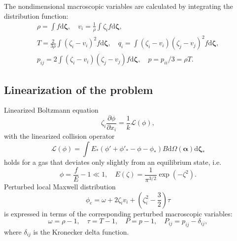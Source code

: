 \documentclass[review]{elsarticle}
\newcommand{\dd}{\mathrm{d}}
\newcommand{\pder}[2][]{\frac{\partial#1}{\partial#2}}
\newcommand{\dzeta}{\boldsymbol{\dd\zeta}}
\begin{document}
The nondimensional macroscopic variables are calculated by integrating the distribution function:
\begin{equation}\label{eq:macro}
    \begin{gathered}
    \rho = \int f \dzeta, \quad
    v_i = \frac1{\rho} \int \zeta_i f \dzeta, \\
    T = \frac{2}{3\rho}\int(\zeta_i-v_i)^2 f \dzeta, \quad
    q_i = \int(\zeta_i-v_i)(\zeta_j-v_j)^2 f \dzeta, \\
    p_{ij} = 2 \int(\zeta_i-v_i)(\zeta_j-v_j) f \dzeta,
        \quad p = p_{ii}/3 = \rho T.
    \end{gathered}
\end{equation}

\subsection{Linearization of the problem}

Linearized Boltzmann equation
\begin{equation}\label{eq:linear_Boltzmann}
    \zeta_i \pder[\phi]{x_i} = \frac1k \mathcal{L}(\phi),
\end{equation}
with the linearized collision operator
\begin{equation}\label{eq:linear_ci}
    \mathcal{L}(\phi) = \int E_*(\phi'+\phi'_*-\phi-\phi_*) B
    \dd \Omega(\boldsymbol{\alpha}) \dzeta_*
\end{equation}
holds for a gas that deviates only slightly from an equilibrium state, i.e.
\begin{equation}\label{eq:linear_condition}
    \phi = \frac{f}{E} - 1 \ll 1, \quad E(\zeta) = \frac1{\pi^{3/2}}\exp\left(-\zeta^2\right).
\end{equation}
Perturbed local Maxwell distribution
\begin{equation}\label{eq:linear_maxwellian}
    \phi_e = \omega + 2\zeta_i v_i + \left(\zeta_i^2-\frac32\right)\tau
\end{equation}
is expressed in terms of the corresponding perturbed macroscopic variables:
\begin{equation}\label{eq:perturbed_variables}
    \omega = \rho-1, \quad \tau = T-1, \quad P = p-1, \quad P_{ij} = p_{ij}-\delta_{ij},
\end{equation}
where \(\delta_{ij}\) is the Kronecker delta function.
\end{document}
